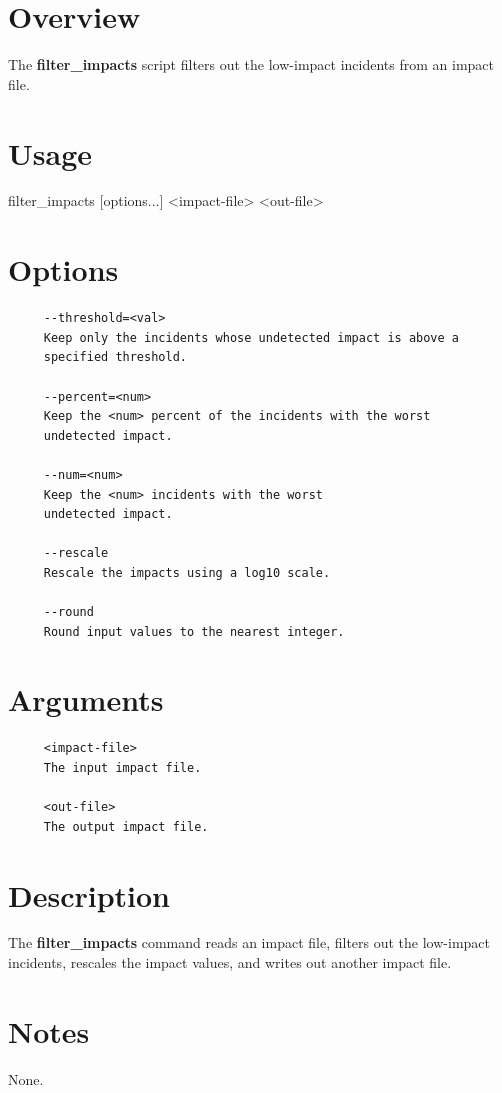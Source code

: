 
\section{Overview}\label{filter_impactsExecutable_filter_impactsOverview}

The {\bfseries filter\_\-impacts} script filters out the low-\/impact incidents from an impact file.

\section{Usage}\label{filter_impactsExecutable_filter_impactsUsage}

\begin{verb}
   filter_impacts [options...] <impact-file> <out-file>
\end{verb}

\section{Options}\label{filter_impactsExecutable_filter_impactsOptions}
\begin{verbatim} 
     --threshold=<val>
     Keep only the incidents whose undetected impact is above a 
     specified threshold.
     
     --percent=<num>
     Keep the <num> percent of the incidents with the worst  
     undetected impact.
     
     --num=<num>    
     Keep the <num> incidents with the worst  
     undetected impact.

     --rescale
     Rescale the impacts using a log10 scale.
     
     --round
     Round input values to the nearest integer.
\end{verbatim}
\section{Arguments}\label{filter_impactsExecutable_filter_impactsArguments}
\begin{verbatim} 
     <impact-file>
     The input impact file.
     
     <out-file>
     The output impact file.
\end{verbatim}
\section{Description}\label{filter_impactsExecutable_filter_impactsDescription}

The {\bfseries filter\_\-impacts} command reads an impact file, filters out the low-\/impact incidents, rescales the impact values, and writes out another impact file.

\section{Notes}\label{filter_impactsExecutable_filter_Notes}

None. 
